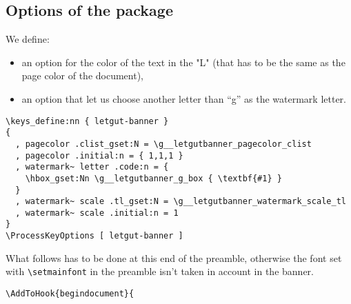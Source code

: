 \documentclass{letgut}
\begin{document}
\subsection{Options of the package}
\label{ImplementationOptionsofthepackage-21ri36v0fck0}
We define:

\begin{itemize}
\item an option for the color of the text in the "L" (that has to be the same as the
page color of the document),
\item an option that let us choose another letter than “g” as the watermark letter.
\end{itemize}

\begin{lstlisting}
\keys_define:nn { letgut-banner }
{
  , pagecolor .clist_gset:N = \g__letgutbanner_pagecolor_clist
  , pagecolor .initial:n = { 1,1,1 }
  , watermark~ letter .code:n = {
    \hbox_gset:Nn \g__letgutbanner_g_box { \textbf{#1} }
  }
  , watermark~ scale .tl_gset:N = \g__letgutbanner_watermark_scale_tl
  , watermark~ scale .initial:n = 1
}
\ProcessKeyOptions [ letgut-banner ]
\end{lstlisting}

What follows has to be done at this end of the preamble, otherwise the font set
with \lstinline+\setmainfont+ in the preamble isn't taken in account in the banner.

\begin{lstlisting}
\AddToHook{begindocument}{
\end{lstlisting}
\end{document}
